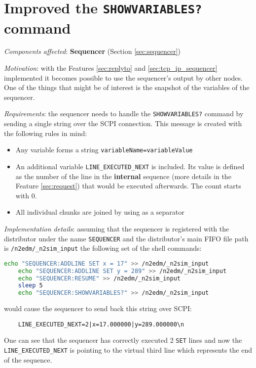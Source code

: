 \section{Improved the \texttt{SHOWVARIABLES?} command}
\label{sec:showvariables}

\textit{Components affected}: \textbf{Sequencer} (Section \ref{sec:sequencer})

\textit{Motivation}: with the Features \ref{sec:replyto} and \ref{sec:tcp_ip_sequencer} implemented it becomes possible to use the sequencer's output by other nodes. One of the things that might be of interest is the snapshot of the variables of the sequencer.

\textit{Requirements}: the sequencer needs to handle the \texttt{SHOWVARIABLES?} command by sending a single string over the SCPI connection. This message is created with the following rules in mind:

\begin{itemize}
	\item Any variable forms a string \texttt{variableName=variableValue}
	\item An additional variable \texttt{LINE\_EXECUTED\_NEXT} is included. Its value is defined as the number of the line in the \textbf{internal} sequence (more details in the Feature \ref{sec:request}) that would be executed afterwards. The count starts with 0.
	\item All individual chunks are joined by using \highlight{|} as a separator
\end{itemize}

\textit{Implementation details}: assuming that the sequencer is registered with the distributor under the name \texttt{SEQUENCER} and the distributor's main FIFO file path is \texttt{/n2edm/\_n2sim\_input} the following set of the shell commands:

\begin{lstlisting}[language=bash]
	echo "SEQUENCER:ADDLINE SET x = 17" >> /n2edm/_n2sim_input
	echo "SEQUENCER:ADDLINE SET y = 289" >> /n2edm/_n2sim_input
	echo "SEQUENCER:RESUME" >> /n2edm/_n2sim_input
	sleep 5
	echo "SEQUENCER:SHOWVARIABLES?" >> /n2edm/_n2sim_input
\end{lstlisting}

would cause the sequencer to send back this string over SCPI:

\begin{verbatim}
	LINE_EXECUTED_NEXT=2|x=17.000000|y=289.000000\n
\end{verbatim}

One can see that the sequencer has correctly executed 2 \texttt{SET} lines and now the \texttt{LINE\_EXECUTED\_NEXT} is pointing to the virtual third line which represents the end of the sequence.